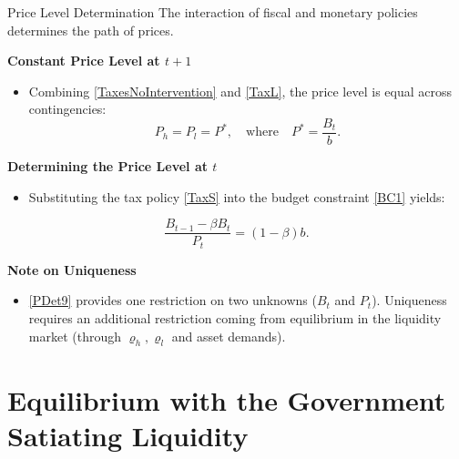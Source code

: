 \documentclass[11pt,aspectratio=169]{beamer}
\begin{document}
\begin{frame}{Price Level Determination}
\small
The interaction of fiscal and monetary policies determines the path of prices.

\vspace{0.2cm}
\textbf{Constant Price Level at $t+1$}
\begin{itemize}
    \item Combining \eqref{TaxesNoIntervention} and \eqref{TaxL}, the price level is equal across contingencies:
    \[ P_{h}=P_{l}=P^{\ast}, \quad \text{where} \quad P^{\ast} = \frac{B_{t}}{b}. \]
\end{itemize}

\vspace{0.2cm}
\textbf{Determining the Price Level at $t$}
\begin{itemize}
    \item Substituting the tax policy \eqref{TaxS} into the budget constraint \eqref{BC1} yields:
\end{itemize}
\begin{equation}
\frac{B_{t-1}-\beta B_{t}}{P_{t}}=(1-\beta )b. \label{PDet9}
\end{equation}

\vspace{0.2cm}
\textbf{Note on Uniqueness}
\begin{itemize}
    \item \eqref{PDet9} provides one restriction on two unknowns ($B_t$ and $P_t$). Uniqueness requires an additional restriction coming from equilibrium in the liquidity market (through $\varrho_h,\varrho_l$ and asset demands).
\end{itemize}
\end{frame}

\section{Equilibrium with the Government Satiating Liquidity}
\end{document}
